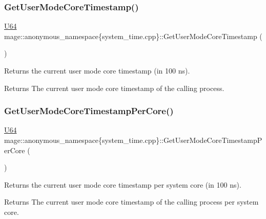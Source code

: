 \subsubsection{\texorpdfstring{Get\+User\+Mode\+Core\+Timestamp()}{GetUserModeCoreTimestamp()}}
{\footnotesize\ttfamily \mbox{\hyperlink{namespacemage_ae0ad2dd0035dba92ed0f2e84c182b03b}{U64}} mage\+::anonymous\+\_\+namespace\{system\+\_\+time.\+cpp\}\+::Get\+User\+Mode\+Core\+Timestamp (\begin{DoxyParamCaption}{ }\end{DoxyParamCaption})\hspace{0.3cm}{\ttfamily [noexcept]}}

Returns the current user mode core timestamp (in 100 ns).

\begin{DoxyReturn}{Returns}
The current user mode core timestamp of the calling process. 
\end{DoxyReturn}
\mbox{\label{namespacemage_1_1anonymous__namespace_02system__time_8cpp_03_a50f87297a0ecbde94ac88a35416c6add}} 
\subsubsection{\texorpdfstring{Get\+User\+Mode\+Core\+Timestamp\+Per\+Core()}{GetUserModeCoreTimestampPerCore()}}
{\footnotesize\ttfamily \mbox{\hyperlink{namespacemage_ae0ad2dd0035dba92ed0f2e84c182b03b}{U64}} mage\+::anonymous\+\_\+namespace\{system\+\_\+time.\+cpp\}\+::Get\+User\+Mode\+Core\+Timestamp\+Per\+Core (\begin{DoxyParamCaption}{ }\end{DoxyParamCaption})\hspace{0.3cm}{\ttfamily [noexcept]}}

Returns the current user mode core timestamp per system core (in 100 ns).

\begin{DoxyReturn}{Returns}
The current user mode core timestamp of the calling process per system core. 
\end{DoxyReturn}


